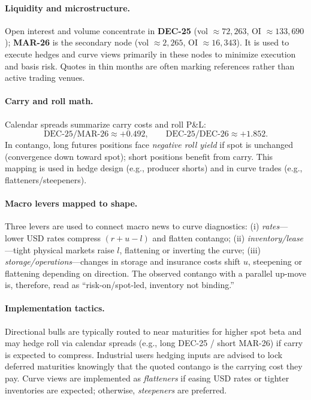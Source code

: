 \documentclass[11pt,a4paper]{article} %
\begin{document}
\paragraph{Liquidity and microstructure.}
Open interest and volume concentrate in \textbf{DEC-25} (vol \(\approx 72{,}263\), OI \(\approx 133{,}690\)); \textbf{MAR-26} is the secondary node (vol \(\approx 2{,}265\), OI \(\approx 16{,}343\)). It is used to execute hedges and curve views primarily in these nodes to minimize execution and basis risk. Quotes in thin months are often marking references rather than active trading venues.

\paragraph{Carry and roll math.}
Calendar spreads summarize carry costs and roll P\&L:
\[
\text{DEC-25/MAR-26} \approx +0.492,\qquad \text{DEC-25/DEC-26} \approx +1.852.
\]
In contango, long futures positions face \emph{negative roll yield} if spot is unchanged (convergence down toward spot); short positions benefit from carry. This mapping is used in hedge design (e.g., producer shorts) and in curve trades (e.g., flatteners/steepeners).

\paragraph{Macro levers mapped to shape.}
Three levers are used to connect macro news to curve diagnostics: (i) \emph{rates}—lower USD rates compress \((r+u-l)\) and flatten contango; (ii) \emph{inventory/lease}—tight physical markets raise \(l\), flattening or inverting the curve; (iii) \emph{storage/operations}—changes in storage and insurance costs shift \(u\), steepening or flattening depending on direction. The observed contango with a parallel up-move is, therefore, read as “risk-on/spot-led, inventory not binding.”

\paragraph{Implementation tactics.}
Directional bulls are typically routed to near maturities for higher spot beta and may hedge roll via calendar spreads (e.g., long DEC-25 / short MAR-26) if carry is expected to compress. Industrial users hedging inputs are advised to lock deferred maturities knowingly that the quoted contango is the carrying cost they pay. Curve views are implemented as \emph{flatteners} if easing USD rates or tighter inventories are expected; otherwise, \emph{steepeners} are preferred.
\end{document}
